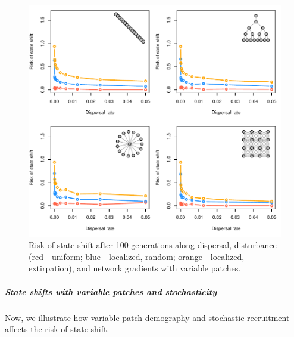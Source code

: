 \documentclass[]{article}
\let\oldsubparagraph\subparagraph
\renewcommand{\subparagraph}[1]{\oldsubparagraph{#1}\mbox{}}
\begin{document}
\begin{figure}[H]

{\centering \includegraphics{Managing_for_ecological_surprises_in_metapopulations_makeHTML_files/figure-latex/unrecovered with variable patches-1} 

}

\caption{Risk of state shift after 100 generations along dispersal, disturbance (red - uniform; blue - localized, random; orange - localized, extirpation), and network gradients with variable patches.}\label{fig:unrecovered with variable patches}
\end{figure}

\hypertarget{state-shifts-with-variable-patches-and-stochasticity}{%
\subparagraph{State shifts with variable patches and
stochasticity}\label{state-shifts-with-variable-patches-and-stochasticity}}

Now, we illustrate how variable patch demography and stochastic
recruitment affects the risk of state shift.
\end{document}
